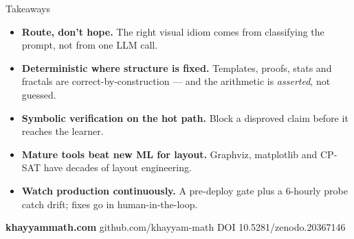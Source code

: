 \documentclass[aspectratio=169,11pt]{beamer}
\begin{document}
\begin{frame}{Takeaways}
  \begin{itemize}
    \item \textbf{Route, don't hope.} The right visual idiom comes from
          classifying the prompt, not from one LLM call.
    \item \textbf{Deterministic where structure is fixed.} Templates,
          proofs, stats and fractals are correct-by-construction --- and
          the arithmetic is \emph{asserted}, not guessed.
    \item \textbf{Symbolic verification on the hot path.} Block a disproved
          claim before it reaches the learner.
    \item \textbf{Mature tools beat new ML for layout.} Graphviz, matplotlib
          and CP-SAT have decades of layout engineering.
    \item \textbf{Watch production continuously.} A pre-deploy gate plus a
          6-hourly probe catch drift; fixes go in human-in-the-loop.
  \end{itemize}
  \vspace{3mm}
  \begin{center}\color{kmblue}\textbf{khayyammath.com}\quad\textbar\quad
  \color{kmgrey}\small github.com/khayyam-math \;\textbar\; DOI 10.5281/zenodo.20367146\end{center}
\end{frame}
\end{document}
